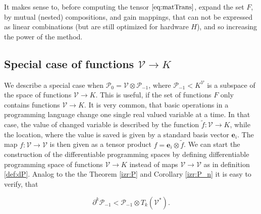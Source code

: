 \documentclass[smallcondensed]{svjour3}
\newcommand{\VV}{\mathcal{V}}
\newcommand{\e}{\mathbf{e}}
\newcommand{\dP}{\mathcal{P}}
\newcommand{\D}{\partial}
\begin{document}
  It makes sense to, before computing the tensor $\eqref{eq:matTrans}$, expand the set $F$, by mutual (nested) compositions, and gain mappings, that can not be expressed as linear combinations (but are still optimized for hardware $H$), and so increasing the power of the method.
\subsection{Special case of functions $\VV\to K$}
We describe a special case when $\dP_0=\VV\otimes\dP_{-1}$, where
$\dP_{-1}<K^\VV$ is a subspace of the space of functions $\VV\to K$. This is
useful, if the set of functions $F$ only contains functions $\VV\to K$. It is
very common, that basic operations in a programming language change one single
real valued variable at a time. In that case, the value of changed variable is
described by the function $\tilde{f}:\VV\to K$, while the location, where the
value is saved is given by a standard basis vector $\e_i$. The map $f:\VV\to \VV$
is then given as a tensor product $f=\e_i\otimes \tilde{f}$. We can start the
construction of the differentiable programming spaces by defining differentiable
programming space of functions $\VV\to K$ instead of maps $\VV\to \VV$ as in
definition \ref{def:dP}.  Analog to the the Theorem \ref{izr:P} and Corollary \ref{izr:P_n}
it is easy to verify, that

\begin{equation}
  \label{eq:tilda_dP}
  \D^k\dP_{-1} < \dP_{-1}\otimes T_k(\VV^*).
\end{equation}
\end{document}
